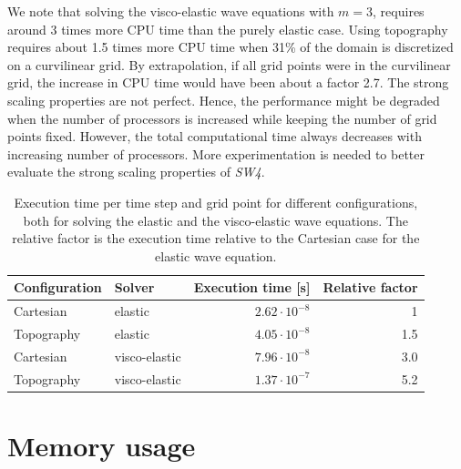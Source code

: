 \documentclass[11pt]{report}
\begin{document}
{We note that solving the visco-elastic wave equations with $m=3$, requires around 3 times more CPU
time than the purely elastic case. Using topography requires about 1.5 times more CPU time when 31\%
of the domain is discretized on a curvilinear grid. By extrapolation, if all grid points were in the
curvilinear grid, the increase in CPU time would have been about a factor 2.7.  The strong scaling
properties are not perfect. Hence, the performance might be degraded when the number of processors
is increased while keeping the number of grid points fixed. However, the total computational time
always decreases with increasing number of processors. More experimentation is needed to better
evaluate the strong scaling properties of \emph{SW4}.
\begin{table}
	\begin{center}
		\begin{tabular}{|l|l|r|r|}\hline
			Configuration & Solver        & Execution time [s]  & Relative factor \\ \hline\hline
			Cartesian     & elastic       & $2.62\cdot 10^{-8}$ & 1               \\ \hline
			Topography    & elastic       & $4.05\cdot 10^{-8}$ & 1.5             \\ \hline
			Cartesian     & visco-elastic & $7.96\cdot 10^{-8}$ & 3.0             \\ \hline
			Topography    & visco-elastic & $1.37\cdot 10^{-7}$ & 5.2             \\ \hline
		\end{tabular}
	\end{center}
	\caption{Execution time per time step and grid point for different configurations, both for
		solving the elastic and the visco-elastic wave equations. The relative factor is the execution time
		relative to the Cartesian case for the elastic wave equation.}\label{tab:cputime-usage}
\end{table}

\section{Memory usage}

}
\end{document}
